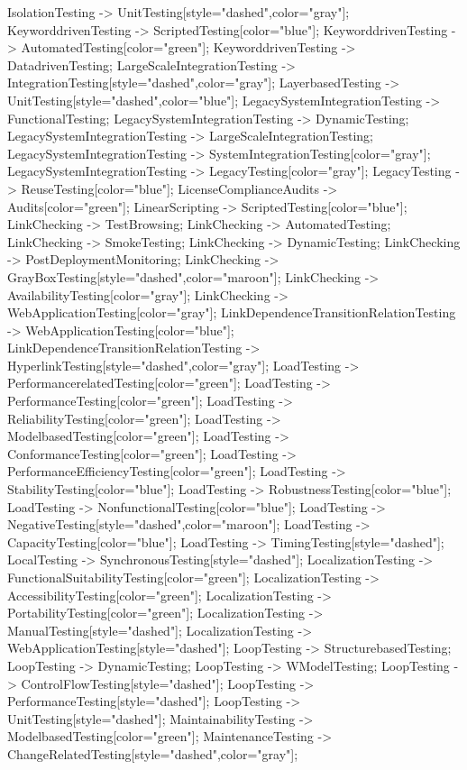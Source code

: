 \documentclass{article}
\begin{document}
{IsolationTesting -> UnitTesting[style="dashed",color="gray"];
KeyworddrivenTesting -> ScriptedTesting[color="blue"];
KeyworddrivenTesting -> AutomatedTesting[color="green"];
KeyworddrivenTesting -> DatadrivenTesting;
LargeScaleIntegrationTesting -> IntegrationTesting[style="dashed",color="gray"];
LayerbasedTesting -> UnitTesting[style="dashed",color="blue"];
LegacySystemIntegrationTesting -> FunctionalTesting;
LegacySystemIntegrationTesting -> DynamicTesting;
LegacySystemIntegrationTesting -> LargeScaleIntegrationTesting;
LegacySystemIntegrationTesting -> SystemIntegrationTesting[color="gray"];
LegacySystemIntegrationTesting -> LegacyTesting[color="gray"];
LegacyTesting -> ReuseTesting[color="blue"];
LicenseComplianceAudits -> Audits[color="green"];
LinearScripting -> ScriptedTesting[color="blue"];
LinkChecking -> TestBrowsing;
LinkChecking -> AutomatedTesting;
LinkChecking -> SmokeTesting;
LinkChecking -> DynamicTesting;
LinkChecking -> PostDeploymentMonitoring;
LinkChecking -> GrayBoxTesting[style="dashed",color="maroon"];
LinkChecking -> AvailabilityTesting[color="gray"];
LinkChecking -> WebApplicationTesting[color="gray"];
LinkDependenceTransitionRelationTesting -> WebApplicationTesting[color="blue"];
LinkDependenceTransitionRelationTesting -> HyperlinkTesting[style="dashed",color="gray"];
LoadTesting -> PerformancerelatedTesting[color="green"];
LoadTesting -> PerformanceTesting[color="green"];
LoadTesting -> ReliabilityTesting[color="green"];
LoadTesting -> ModelbasedTesting[color="green"];
LoadTesting -> ConformanceTesting[color="green"];
LoadTesting -> PerformanceEfficiencyTesting[color="green"];
LoadTesting -> StabilityTesting[color="blue"];
LoadTesting -> RobustnessTesting[color="blue"];
LoadTesting -> NonfunctionalTesting[color="blue"];
LoadTesting -> NegativeTesting[style="dashed",color="maroon"];
LoadTesting -> CapacityTesting[color="blue"];
LoadTesting -> TimingTesting[style="dashed"];
LocalTesting -> SynchronousTesting[style="dashed"];
LocalizationTesting -> FunctionalSuitabilityTesting[color="green"];
LocalizationTesting -> AccessibilityTesting[color="green"];
LocalizationTesting -> PortabilityTesting[color="green"];
LocalizationTesting -> ManualTesting[style="dashed"];
LocalizationTesting -> WebApplicationTesting[style="dashed"];
LoopTesting -> StructurebasedTesting;
LoopTesting -> DynamicTesting;
LoopTesting -> WModelTesting;
LoopTesting -> ControlFlowTesting[style="dashed"];
LoopTesting -> PerformanceTesting[style="dashed"];
LoopTesting -> UnitTesting[style="dashed"];
MaintainabilityTesting -> ModelbasedTesting[color="green"];
MaintenanceTesting -> ChangeRelatedTesting[style="dashed",color="gray"];
}
\end{document}
